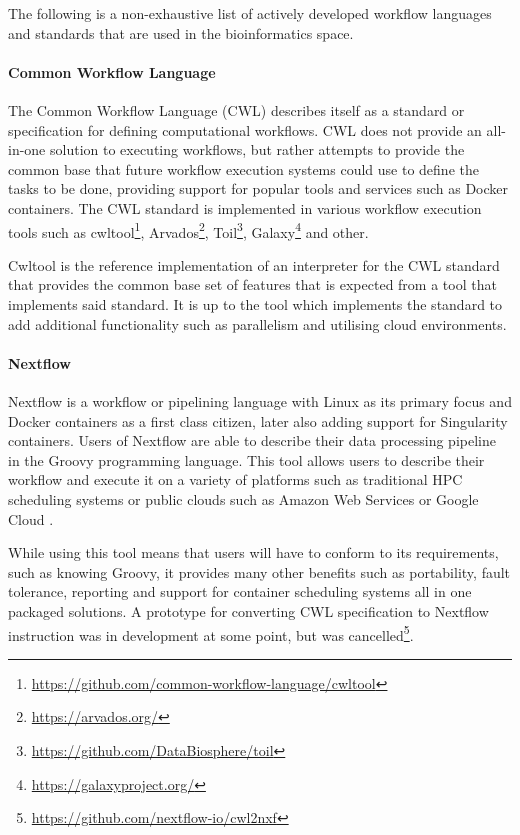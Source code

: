 The following is a non-exhaustive list of actively developed workflow languages and standards that are used in the bioinformatics space.

\paragraph{Common Workflow Language} The Common Workflow Language (CWL) describes itself as a standard or specification for defining computational workflows. CWL does not provide an all-in-one solution to executing workflows, but rather attempts to provide the common base that future workflow execution systems could use to define the tasks to be done\parencite{amstutz2016common}, providing support for popular tools and services such as Docker containers. The CWL standard is implemented in various workflow execution tools such as cwltool\footnote{\url{https://github.com/common-workflow-language/cwltool}}, Arvados\footnote{\url{https://arvados.org/}}, Toil\footnote{\url{https://github.com/DataBiosphere/toil}}, Galaxy\footnote{\url{https://galaxyproject.org/}} and other.

Cwltool is the reference implementation of an interpreter for the CWL standard that provides the common base set of features that is expected from a tool that implements said standard. It is up to the tool which implements the standard to add additional functionality such as parallelism and utilising cloud environments.

\paragraph{Nextflow} Nextflow is a workflow or pipelining language with Linux as its primary focus and Docker containers as a first class citizen, later also adding support for Singularity containers. Users of Nextflow are able to describe their data processing pipeline in the Groovy programming language. This tool allows users to describe their workflow and execute it on a variety of platforms such as traditional HPC scheduling systems or public clouds such as Amazon Web Services or Google Cloud \parencite{di2017nextflow}.

While using this tool means that users will have to conform to its requirements, such as knowing Groovy, it provides many other benefits such as portability, fault tolerance, reporting and support for container scheduling systems all in one packaged solutions. A prototype for converting CWL specification to Nextflow instruction was in development at some point, but was cancelled\footnote{\url{https://github.com/nextflow-io/cwl2nxf}}.

